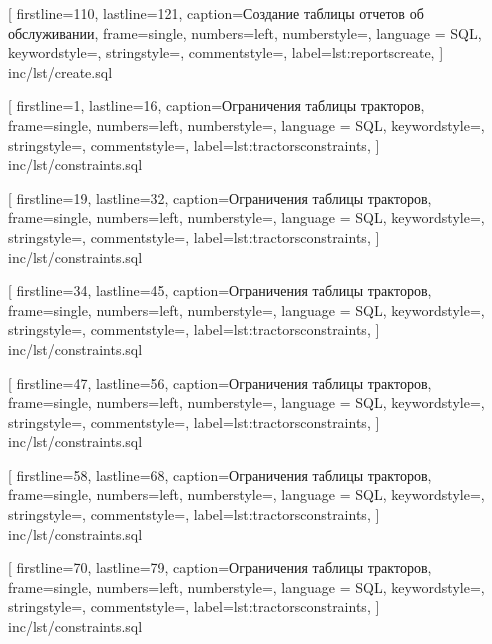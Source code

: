 
[
    firstline=110,
    lastline=121,
    caption=Создание таблицы отчетов об обслуживании,
    frame=single,
    numbers=left,
	numberstyle=\footnotesize\color{numbers},
    language = SQL,
    keywordstyle=\color{keywords},
	stringstyle=\color{strings},
	commentstyle=\color{comments},
    label={lst:reportscreate},
]
{inc/lst/create.sql}


[
    firstline=1,
    lastline=16,
    caption=Ограничения таблицы тракторов,
    frame=single,
    numbers=left,
	numberstyle=\footnotesize\color{numbers},
    language = SQL,
    keywordstyle=\color{keywords},
	stringstyle=\color{strings},
	commentstyle=\color{comments},
    label={lst:tractorsconstraints},
]
{inc/lst/constraints.sql}


[
    firstline=19,
    lastline=32,
    caption=Ограничения таблицы тракторов,
    frame=single,
    numbers=left,
	numberstyle=\footnotesize\color{numbers},
    language = SQL,
    keywordstyle=\color{keywords},
	stringstyle=\color{strings},
	commentstyle=\color{comments},
    label={lst:tractorsconstraints},
]
{inc/lst/constraints.sql}


[
    firstline=34,
    lastline=45,
    caption=Ограничения таблицы тракторов,
    frame=single,
    numbers=left,
	numberstyle=\footnotesize\color{numbers},
    language = SQL,
    keywordstyle=\color{keywords},
	stringstyle=\color{strings},
	commentstyle=\color{comments},
    label={lst:tractorsconstraints},
]
{inc/lst/constraints.sql}


[
    firstline=47,
    lastline=56,
    caption=Ограничения таблицы тракторов,
    frame=single,
    numbers=left,
	numberstyle=\footnotesize\color{numbers},
    language = SQL,
    keywordstyle=\color{keywords},
	stringstyle=\color{strings},
	commentstyle=\color{comments},
    label={lst:tractorsconstraints},
]
{inc/lst/constraints.sql}


[
    firstline=58,
    lastline=68,
    caption=Ограничения таблицы тракторов,
    frame=single,
    numbers=left,
	numberstyle=\footnotesize\color{numbers},
    language = SQL,
    keywordstyle=\color{keywords},
	stringstyle=\color{strings},
	commentstyle=\color{comments},
    label={lst:tractorsconstraints},
]
{inc/lst/constraints.sql}


[
    firstline=70,
    lastline=79,
    caption=Ограничения таблицы тракторов,
    frame=single,
    numbers=left,
	numberstyle=\footnotesize\color{numbers},
    language = SQL,
    keywordstyle=\color{keywords},
	stringstyle=\color{strings},
	commentstyle=\color{comments},
    label={lst:tractorsconstraints},
]
{inc/lst/constraints.sql}

